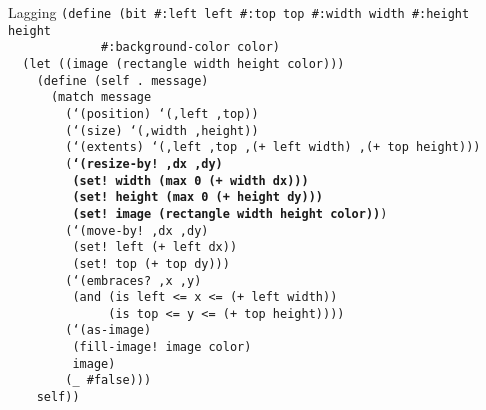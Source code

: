 \begin{frame}{Lagging}
  \tiny
  \texttt{(define (bit \#:left left \#:top top \#:width width \#:height height\\
    \ \ \ \ \ \ \ \ \ \ \ \ \ \#:background-color color)\\
    \ \ (let ((image (rectangle width height color)))\\
    \ \ \ \ (define (self .\ message)\\
    \ \ \ \ \ \ (match message\\
    \ \ \ \ \ \ \ \ (`(position) `(,left ,top))\\
    \ \ \ \ \ \ \ \ (`(size) `(,width ,height))\\
    \ \ \ \ \ \ \ \ (`(extents) `(,left ,top ,(+ left width) ,(+ top height)))\\
    \ \ \ \ \ \ \ \ (\textbf{`(resize-by!\ ,dx ,dy)\\
    \ \ \ \ \ \ \ \ \ (set!\ width (max 0 (+ width dx)))\\
    \ \ \ \ \ \ \ \ \ (set!\ height (max 0 (+ height dy)))\\
    \ \ \ \ \ \ \ \ \ (set!\ image (rectangle width height color))})\\
    \ \ \ \ \ \ \ \ (`(move-by!\ ,dx ,dy)\\
    \ \ \ \ \ \ \ \ \ (set!\ left (+ left dx))\\
    \ \ \ \ \ \ \ \ \ (set!\ top (+ top dy)))\\
    \ \ \ \ \ \ \ \ (`(embraces?\ ,x ,y)\\
    \ \ \ \ \ \ \ \ \ (and (is left <= x <= (+ left width))\\
    \ \ \ \ \ \ \ \ \ \ \ \ \ \ (is top <= y <= (+ top height))))\\
    \ \ \ \ \ \ \ \ (`(as-image)\\
    \ \ \ \ \ \ \ \ \ (fill-image!\ image color)\\
    \ \ \ \ \ \ \ \ \ image)\\
    \ \ \ \ \ \ \ \ (\_ \#false)))\\
    \ \ \ \ self))
  }
\end{frame}

